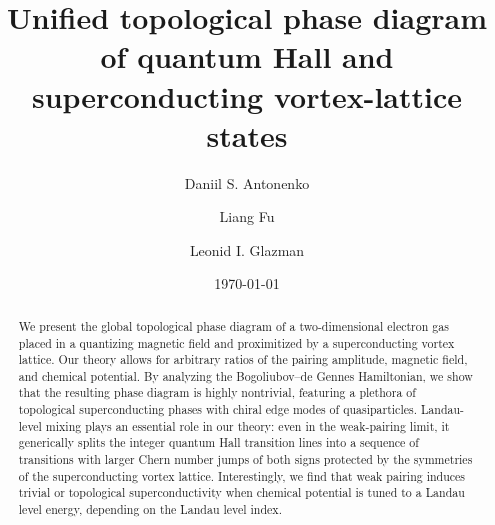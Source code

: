 \documentclass[10pt,prb,aps,superscriptaddress,amsmath,amssymb,twocolumn,floatfix,longbibliography]{revtex4-1}
\begin{document}
\title{Unified topological phase diagram of quantum Hall and superconducting vortex-lattice states}



\author{Daniil S. Antonenko}
\author{Liang Fu}
\author{Leonid I. Glazman}
\date{\today}

\begin{abstract}

We present the global topological phase diagram of a two-dimensional electron gas placed in a quantizing magnetic field and proximitized by a superconducting vortex lattice. Our theory allows for arbitrary ratios of the pairing amplitude, magnetic field, and chemical potential. 
By analyzing the Bogoliubov–de Gennes Hamiltonian, we show that the resulting phase diagram is highly nontrivial, featuring a plethora of topological superconducting phases with chiral edge modes of quasiparticles. 
Landau-level mixing plays an essential role in our theory: even in the weak-pairing limit, it generically splits the integer quantum Hall transition lines into a sequence of transitions with larger Chern number jumps of both signs protected by the symmetries of the superconducting vortex lattice.
Interestingly, we find that weak pairing induces trivial or topological superconductivity when chemical potential is tuned to a Landau level energy, depending on the Landau level index.

\end{abstract}

\maketitle


\end{document}
